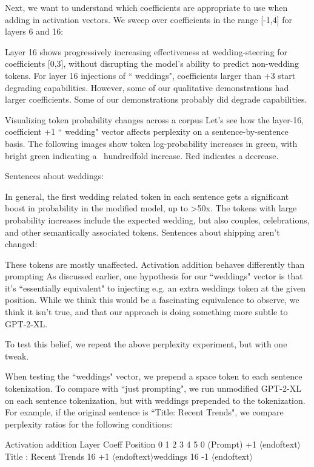 \documentclass[10pt]{article}
\newcommand{\eot}{$\langle$\textbar endoftext\textbar$\rangle$}
\begin{document}
Next, we want to understand which coefficients are appropriate to use when adding in activation vectors. We sweep over coefficients in the range 
[-1,4] for layers 6 and 16:


Layer 16 shows progressively increasing effectiveness at wedding-steering for coefficients [0,3], without disrupting the model's ability to predict non-wedding tokens.%
For layer 16 injections of `` weddings", coefficients larger than +3 start degrading capabilities. However, some of our qualitative demonstrations had larger coefficients. Some of our demonstrations probably did degrade capabilities.

Visualizing token probability changes across a corpus
Let's see how the layer-16, coefficient +1 `` wedding" vector affects perplexity on a sentence-by-sentence basis. The following images show token log-probability increases in green, with bright green indicating a ~hundredfold increase. Red indicates a decrease.

Sentences about weddings:


In general, the first wedding related token in each sentence gets a significant boost in probability in the modified model, up to >50x. The tokens with large probability increases include the expected  wedding, but also  couples,  celebrations, and other semantically associated tokens.
Sentences about shipping aren't changed:


These tokens are mostly unaffected.
Activation addition behaves differently than prompting
As discussed earlier, one hypothesis for our ``weddings" vector is that it's ``essentially equivalent" to injecting e.g. an extra  weddings token at the given position. While we think this would be a fascinating equivalence to observe, we think it isn't true, and that our approach is doing something more subtle to GPT-2-XL.

To test this belief, we repeat the above perplexity experiment, but with one tweak.

When testing the ``weddings" vector, we prepend a space token   to each sentence tokenization.  
To compare with ``just prompting", we run unmodified GPT-2-XL on each sentence tokenization, but with  weddings prepended to the tokenization.
For example, if the original sentence is ``Title: Recent Trends", we compare perplexity ratios for the following conditions:

Activation addition
Layer	Coeff	Position 0	1	2	3	4	5
0 (Prompt)	+1	\eot	 	Title	:	 Recent	 Trends
16	+1	\eot	 weddings	 	 	 	 
16	-1	\eot	 	 	 	 	 
\end{document}
